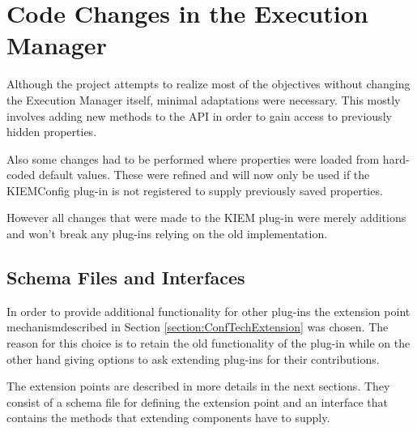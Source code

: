\chapter{Code Changes in the Execution Manager}
\label{chapter:KiemChanges}
Although the project attempts to realize most of the objectives without
changing the Execution Manager itself, minimal adaptations were necessary.
This mostly involves adding new methods to the \ac{API} in order to
gain access to previously hidden properties.

Also some changes had to be performed where properties were loaded from hard-coded 
default values. These were refined and will now only be used if the \ac{KIEMConfig} 
plug-in is not registered to supply previously saved properties.

However all changes that were made to the \ac{KIEM} plug-in were merely additions
and won't break any plug-ins relying on the old implementation.

\section{Schema Files and Interfaces}
In order to provide additional functionality for other plug-ins the extension
point mechanismdescribed in Section \ref{section:ConfTechExtension} was chosen. The reason
for this choice is to retain the old functionality of the plug-in while on the other hand giving
options to ask extending plug-ins for their contributions. 

The extension points are described in more details in the next sections. They consist
of a schema file for defining the extension point and an interface that contains the 
methods that extending components have to supply.

